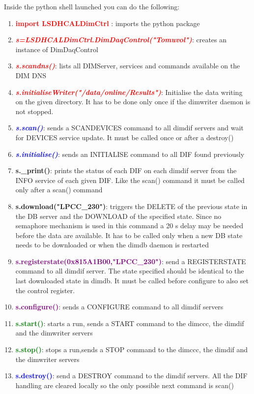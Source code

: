 \documentclass[english]{article}
\begin{document}
Inside the python shell launched you can do the following:

\begin{enumerate} 
\item \textcolor{red}{ \bf  import LSDHCALDimCtrl} :  imports the python package

\item \textcolor{red}{\it \bf s=LSDHCALDimCtrl.DimDaqControl("Tomuvol")}:  creates an instance of DimDaqControl

\item \textcolor{red}{\it \bf s.scandns()}: lists all DIMServer, services and commands available on the DIM DNS  
\item \textcolor{red}{\it \bf s.initialiseWriter("/data/online/Results")}: Initialise the data writing on the given directory. It has to be done only once if the dimwriter daemon is not stopped.

\item \textcolor{blue}{\it \bf s.scan()}: sends a SCANDEVICES command to all dimdif servers and wait for DEVICES service update. It must be called once or after a destroy()


\item \textcolor{blue}{\it {\bf s.initialise()}}: sends an INITIALISE command to all DIF found previously
\item {\bf s.\_print()}: prints the status of each DIF on each dimdif server from the INFO service of each given DIF. Like the scan() command it must be called only after a scan() command

\item {\bf s.download("LPCC\_230")}: triggers the DELETE of the previous state in the DB server and the DOWNLOAD of the specified state. Since no semaphore mechanism is used in this command a 20 s delay may be needed before the data are available. It has to be called only when a new DB state needs to be downloaded or when the dimdb daemon is restarted

\item \textcolor{purple}{\bf s.registerstate(0x815A1B00,"LPCC\_230")}: send a REGISTERSTATE command to all dimdif server. The state specified should be identical to the last downloaded state in dimdb. It must be called before configure to also set the control register.

\item \textcolor{purple}{\bf s.configure()}: sends a CONFIGURE command to all dimdif servers




\item \textcolor{green}{\bf s.start()}: starts a run, sends a START command to the dimccc, the dimdif and the dimwriter servers 

\item \textcolor{green}{\bf s.stop()}: stops a run,sends a STOP command to the dimccc, the dimdif and the dimwriter servers
\item \textcolor{blue}{\bf s.destroy()}: send a DESTROY command to the dimdif servers. All the DIF handling are cleared locally so the only possible next command is scan()
\end{enumerate} 
\end{document}
